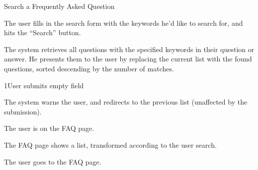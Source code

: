 
\begin{uc}{Search a Frequently Asked Question}

    \begin{uc-mss}
    \item The user fills in the search form with the keywords he'd like to
        search for, and hits the ``Search'' button.
    \item The system retrieves all questions with the specified keywords in
        their question or answer. He presents them to the user by replacing the
        current list with the found questions, sorted descending by the number
        of matches.
    \end{uc-mss}

    \begin{uc-ext}

        \begin{uc-fail}{1}{User submits empty field}
        \item The system warns the user, and redirects to the previous list
            (unaffected by the submission).
        \end{uc-fail}

    \end{uc-ext}

    \begin{uc-pre}
    \item The user is on the FAQ page.
    \end{uc-pre}

    \begin{uc-post}
    \item The FAQ page shows a list, transformed according to the user search.
    \end{uc-post}

    \begin{uc-trig}
        The user goes to the FAQ page.
    \end{uc-trig}

\end{uc}

